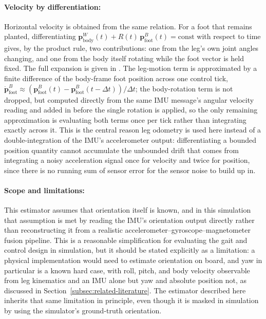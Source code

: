 \documentclass[12pt]{article}
\begin{document}
\paragraph{Velocity by differentiation:} Horizontal velocity is obtained from the same relation. For a foot that remains planted, differentiating $\mathbf{p}^{W}_{\text{body}}(t) + R(t)\,\mathbf{p}^{B}_{\text{foot}}(t) = \text{const}$ with respect to time gives, by the product rule, two contributions: one from the leg's own joint angles changing, and one from the body itself rotating while the foot vector is held fixed. The full expansion is given in . The leg-motion term is approximated by a finite difference of the body-frame foot position across one control tick, $\dot{\mathbf{p}}^{B}_{\text{foot}} \approx (\mathbf{p}^{B}_{\text{foot}}(t) - \mathbf{p}^{B}_{\text{foot}}(t-\Delta t))/\Delta t$; the body-rotation term is not dropped, but computed directly from the same IMU message's angular velocity reading and added in before the single rotation is applied, so the only remaining approximation is evaluating both terms once per tick rather than integrating exactly across it. This is the central reason leg odometry is used here instead of a double-integration of the IMU's accelerometer output: differentiating a bounded position quantity cannot accumulate the unbounded drift that comes from integrating a noisy acceleration signal once for velocity and twice for position, since there is no running sum of sensor error for the sensor noise to build up in.

\paragraph{Scope and limitations:} This estimator assumes that orientation itself is known, and in this simulation that assumption is met by reading the IMU's orientation output directly rather than reconstructing it from a realistic accelerometer--gyroscope--magnetometer fusion pipeline. This is a reasonable simplification for evaluating the gait and control design in simulation, but it should be stated explicitly as a limitation: a physical implementation would need to estimate orientation on board, and yaw in particular is a known hard case, with roll, pitch, and body velocity observable from leg kinematics and an IMU alone but yaw and absolute position not, as discussed in Section~\ref{subsec:related-literature}. The estimator described here inherits that same limitation in principle, even though it is masked in simulation by using the simulator's ground-truth orientation.
\end{document}
